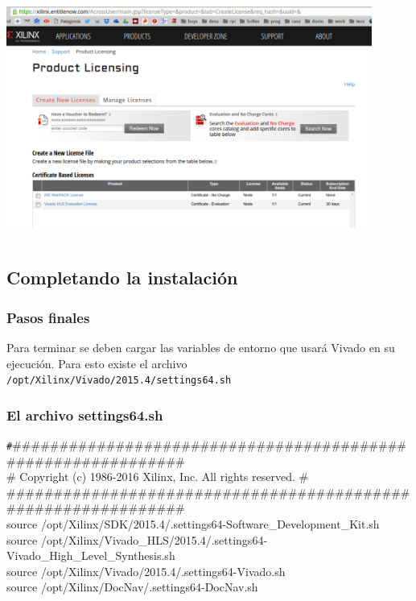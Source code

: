\documentclass[a4paper,11pt]{article}
\begin{document}
    \begin{center}
    \includegraphics[height=8cm,width=12cm]{vivado_installer_16}
    \end{center}

\subsection{Completando la instalación}
\subsubsection{Pasos finales}
    Para terminar se deben cargar las variables de entorno que usará Vivado en
    su ejecución. Para esto existe el archivo
\texttt{/opt/Xilinx/Vivado/2015.4/settings64.sh}
\subsubsection{El archivo \textbf{settings64.sh}}
{\tiny{\texttt \#\#\#\#\#\#\#\#\#\#\#\#\#\#\#\#\#\#\#\#\#\#\#\#\#\#\#\#\#\#\#\#\#\#\#\#\#\#\#\#\#\#\#\#\#\#\#\#\#\#\#\#\#\#\#\#\#\#\#\#\#\#\\
      \# Copyright (c) 1986-2016 Xilinx, Inc.  All rights reserved. \#\\
      \#\#\#\#\#\#\#\#\#\#\#\#\#\#\#\#\#\#\#\#\#\#\#\#\#\#\#\#\#\#\#\#\#\#\#\#\#\#\#\#\#\#\#\#\#\#\#\#\#\#\#\#\#\#\#\#\#\#\#\#\#\#\\
      \vspace{4mm}
      source /opt/Xilinx/SDK/2015.4/.settings64-Software\_Development\_Kit.sh\\
      source
/opt/Xilinx/Vivado\_HLS/2015.4/.settings64-Vivado\_High\_Level\_Synthesis.sh\\
      source /opt/Xilinx/Vivado/2015.4/.settings64-Vivado.sh\\
      source /opt/Xilinx/DocNav/.settings64-DocNav.sh}}
\end{document}
